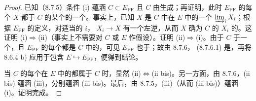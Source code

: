 \begin{proof}
已知（8.7.5）条件 (i) 蕴涵 $C\subset E_{\mathrm{PF}}$ 且 $C$ 由生成；再证明，此时 $E_{\mathrm{PF}}$ 的每个 $X$ 都于 $C$ 的某个的一个。事实上，已知 $X$ 是 $C$ 中在 $E$ 中的一个 $\varinjlim_iX_i$；根据 $E_{\mathrm{PF}}$ 的定义，对适当的 $i$， $X_i\to X$ 有一个左逆，从而 $X$ 确为 $C$ 的 $X_i$ 的。这证明 (i)$\Rightarrow$(ii)（事实上不需要对 $C$ 或 $E$ 作假设）。证明 (ii)$\Rightarrow$(i)。由于 $C$ 于一个，且 $E_{\mathrm{PF}}$ 的每个都是 $C$ 中的，可见 $E_{\mathrm{PF}}$ 也于；故由 8.7.6， (8.7.6.1) 是，再将 8.6.4 b) 应用于包含 $E\hookrightarrow E_{\mathrm{PF}}$，便得到结论。

当 $C$ 的每个在 $E$ 中的都属于 $C$ 时，显然 (ii)$\Leftrightarrow$(ii bis)。另一方面，由 8.7.6，(ii bis) 蕴涵 (iii)，分别蕴涵 (iii bis)。最后，由 8.7.5，(iii)（从而 (iii bis)）蕴涵 (i)。证明完成。
\end{proof}

